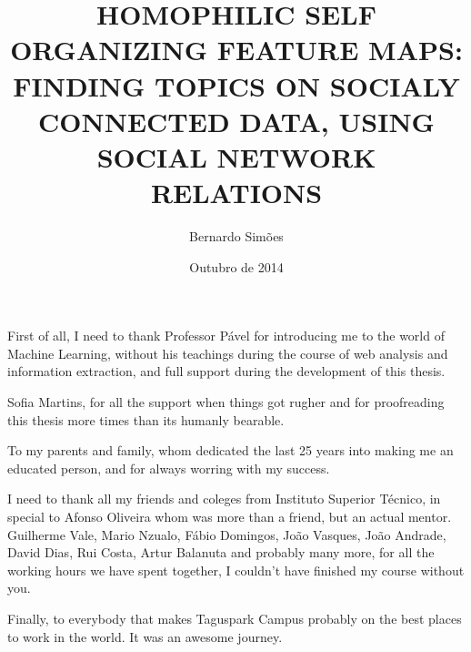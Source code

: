 

\title{HOMOPHILIC SELF ORGANIZING FEATURE MAPS: FINDING TOPICS ON SOCIALY CONNECTED DATA, USING SOCIAL NETWORK RELATIONS}

\author{Bernardo Simões}


\date{Outubro de 2014}



\maketitle
\clearpage

\thispagestyle{empty}
\cleardoublepage

\setcounter{page}{1} 

\baselineskip 18pt %
 
\begin{acknowledgments}
  First of all, I need to thank Professor Pável for introducing me to the world of Machine Learning, without his teachings during the course of web analysis and information extraction, and full support during the development of this thesis. 

  Sofia Martins, for all the support when things got rugher and for proofreading this thesis more times than its humanly bearable.

  To my parents and family, whom dedicated the last 25 years into making me an educated person, and for always worring with my success.

  I need to thank all my friends and coleges from Instituto Superior Técnico, in special to Afonso Oliveira whom was more than a friend, but an actual mentor. Guilherme Vale, Mario Nzualo, Fábio Domingos, João Vasques, João Andrade, David Dias, Rui Costa, Artur Balanuta and probably many more, for all the working hours we have spent together, I couldn't have finished my course without you.

  Finally, to everybody that makes Taguspark Campus probably on the best places to work in the world. It was an awesome journey.
\end{acknowledgments}
 
